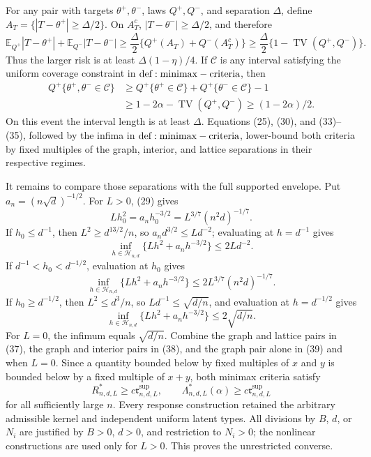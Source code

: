 For any pair with targets \(\theta^+,\theta^-\), laws \(Q^+,Q^-\), and separation \(\Delta\), define \(A_T=\{|T-\theta^+|\geq\Delta/2\}\).  On \(A_T^c\), \(|T-\theta^-|\geq\Delta/2\), and therefore
\[
 \mathbb E_{Q^+}|T-\theta^+|+\mathbb E_{Q^-}|T-\theta^-|
 \geq\frac\Delta2\{Q^+(A_T)+Q^-(A_T^c)\}
 \geq\frac\Delta2\{1-\operatorname{TV}(Q^+,Q^-)\}.
\tag{34}
\]
Thus the larger risk is at least \(\Delta(1-\eta)/4\).  If \(\mathcal C\) is any interval satisfying the uniform coverage constraint in \({\rm def:minimax-criteria}\), then
\[
\begin{aligned}
 Q^+\{\theta^+,\theta^-\in\mathcal C\}
 &\geq Q^+\{\theta^+\in\mathcal C\}+Q^+\{\theta^-\in\mathcal C\}-1\\
 &\geq1-2\alpha-\operatorname{TV}(Q^+,Q^-)
 \geq(1-2\alpha)/2.
\end{aligned}
\tag{35}
\]
On this event the interval length is at least \(\Delta\).  Equations (25), (30), and (33)--(35), followed by the infima in \({\rm def:minimax-criteria}\), lower-bound both criteria by fixed multiples of the graph, interior, and lattice separations in their respective regimes.

It remains to compare those separations with the full supported envelope.  Put \(a_n=(n\sqrt d)^{-1/2}\).  For \(L>0\), (29) gives
\[
 Lh_0^2=a_nh_0^{-3/2}=L^{3/7}(n^2d)^{-1/7}.
\tag{36}
\]
If \(h_0\leq d^{-1}\), then \(L^2\geq d^{13/2}/n\), so \(a_nd^{3/2}\leq Ld^{-2}\); evaluating at \(h=d^{-1}\) gives
\[
 \inf_{h\in\mathcal H_{n,d}}\{Lh^2+a_nh^{-3/2}\}\leq2Ld^{-2}.
\tag{37}
\]
If \(d^{-1}<h_0<d^{-1/2}\), evaluation at \(h_0\) gives
\[
 \inf_{h\in\mathcal H_{n,d}}\{Lh^2+a_nh^{-3/2}\}
 \leq2L^{3/7}(n^2d)^{-1/7}.
\tag{38}
\]
If \(h_0\geq d^{-1/2}\), then \(L^2\leq d^3/n\), so \(Ld^{-1}\leq\sqrt{d/n}\), and evaluation at \(h=d^{-1/2}\) gives
\[
 \inf_{h\in\mathcal H_{n,d}}\{Lh^2+a_nh^{-3/2}\}\leq2\sqrt{d/n}.
\tag{39}
\]
For \(L=0\), the infimum equals \(\sqrt{d/n}\).  Combine the graph and lattice pairs in (37), the graph and interior pairs in (38), and the graph pair alone in (39) and when \(L=0\).  Since a quantity bounded below by fixed multiples of \(x\) and \(y\) is bounded below by a fixed multiple of \(x+y\), both minimax criteria satisfy
\[
 R^*_{n,d,L}\geq c\mathfrak r^{\mathrm{sup}}_{n,d,L},
 \qquad \Lambda^*_{n,d,L}(\alpha)\geq c\mathfrak r^{\mathrm{sup}}_{n,d,L}
\tag{40}
\]
for all sufficiently large \(n\).  Every response construction retained the arbitrary admissible kernel and independent uniform latent types.  All divisions by \(B\), \(d\), or \(N_i\) are justified by \(B>0\), \(d>0\), and restriction to \(N_i>0\); the nonlinear constructions are used only for \(L>0\).  This proves the unrestricted converse.
